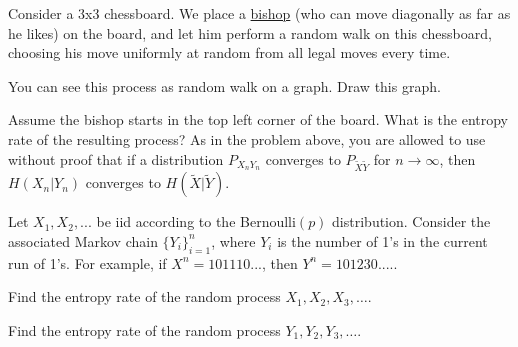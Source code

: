 \documentclass[a4paper,10pt,landscape,twocolumn]{scrartcl}
\begin{document}



\begin{exercise}
Consider a 3x3 chessboard. We place a \href{https://en.wikipedia.org/wiki/Bishop_(chess)}{bishop} (who can move diagonally as far as he likes) on the board, and let him perform a random walk on this chessboard, choosing his move uniformly at random from all legal moves every time. 

\begin{subex}
You can see this process as random walk on a graph. Draw this graph.
\end{subex}

\begin{subex}
Assume the bishop starts in the top left corner of the board. What is the entropy rate of the resulting process? As in the problem above, you are allowed to use without proof that if a distribution $P_{X_n Y_n}$ converges to $P_{\tilde{X} \tilde{Y}}$ for $n \to \infty$, then $H(X_n|Y_n)$ converges to $H(\tilde{X}|\tilde{Y})$.
\end{subex}

\end{exercise}


\begin{exercise}
Let $X_1, X_2, ...$ be iid according to the Bernoulli$(p)$ distribution. Consider the associated Markov chain $\{Y_i\}_{i=1}^n$, where $Y_i$ is the number of 1's in the current run of 1's. For example, if $X^n = 101110...$, then $Y^n = 101230....$.
\begin{subex}
Find the entropy rate of the random process $X_1, X_2, X_3, \ldots$.
\end{subex}
\begin{subex}
Find the entropy rate of the random process $Y_1, Y_2, Y_3, \ldots$.
\end{subex}
\end{exercise}
\end{document}
